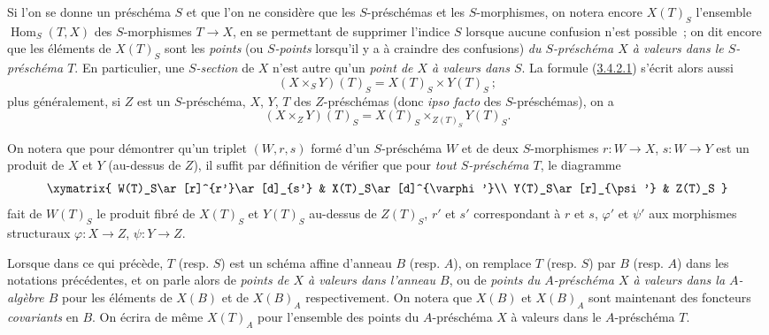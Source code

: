 \begin{env}[3.4.3]
\label{I.3.4.3-fr}
Si l'on se donne un préschéma $S$ et que l'on ne considère que les
$S$-préschémas et les $S$-morphismes, on notera encore $X(T)_S$ l'ensemble
$\operatorname{Hom}_S(T,X)$ des $S$-morphismes $T\to X$, en se permettant de
supprimer l'indice $S$ lorsque aucune confusion n'est possible~; on dit encore
que les éléments de $X(T)_S$ sont les \emph{points} (ou \emph{$S$-points}
lorsqu'il y a à craindre des confusions) \emph{du $S$-préschéma $X$ à valeurs
dans le $S$-préschéma $T$}. En particulier, une \emph{$S$-section} de $X$
n'est autre qu'un \emph{point de $X$ à valeurs dans $S$}. La formule
(\hyperref[I.3.4.2.1-fr]{3.4.2.1}) s'écrit alors aussi
\label{I.3.4.3.1-fr}
\[
  (X\times_S Y)(T)_S=X(T)_S\times Y(T)_S~;
  \tag{3.4.3.1}
\]
plus généralement, si $Z$ est un $S$-préschéma, $X$, $Y$, $T$ des
$Z$-préschémas (donc \emph{ipso facto} des $S$-préschémas), on a
\label{I.3.4.3.2-fr}
\[
  (X\times_Z Y)(T)_S=X(T)_S\times_{Z(T)_S}Y(T)_S.
  \tag{3.4.3.2}
\]

On notera que pour démontrer qu'un triplet $(W,r,s)$ formé d'un $S$-préschéma
$W$ et de deux $S$-morphismes $r:W\to X$, $s:W\to Y$ est un produit de $X$ et
$Y$ (au-dessus de $Z$), il suffit par définition de vérifier que pour
\emph{tout $S$-préschéma $T$}, le diagramme
\label{I.3.4.3.product-diagram-fr}
\[
  \xymatrix{
    W(T)_S\ar[r]^{r'}\ar[d]_{s'} & X(T)_S\ar[d]^{\varphi'}\\
    Y(T)_S\ar[r]_{\psi'} & Z(T)_S
  }
\]
fait de $W(T)_S$ le produit fibré de $X(T)_S$ et $Y(T)_S$ au-dessus de
$Z(T)_S$, $r'$ et $s'$ correspondant à $r$ et $s$, $\varphi'$ et $\psi'$ aux
morphismes structuraux $\varphi:X\to Z$, $\psi:Y\to Z$.
\end{env}

\begin{env}[3.4.4]
\label{I.3.4.4-fr}
Lorsque dans ce qui précède, $T$ (resp. $S$) est un schéma affine d'anneau $B$
(resp. $A$), on remplace $T$ (resp. $S$) par $B$ (resp. $A$) dans les notations
précédentes, et on parle alors de \emph{points de $X$ à valeurs dans l'anneau
$B$}, ou de \emph{points du $A$-préschéma $X$ à valeurs dans la $A$-algèbre
$B$} pour les éléments de $X(B)$ et de $X(B)_A$ respectivement. On notera que
$X(B)$ et $X(B)_A$ sont maintenant des foncteurs \emph{covariants} en $B$. On
écrira de même $X(T)_A$ pour l'ensemble des points du $A$-préschéma $X$ à
valeurs dans le $A$-préschéma $T$.
\end{env}

